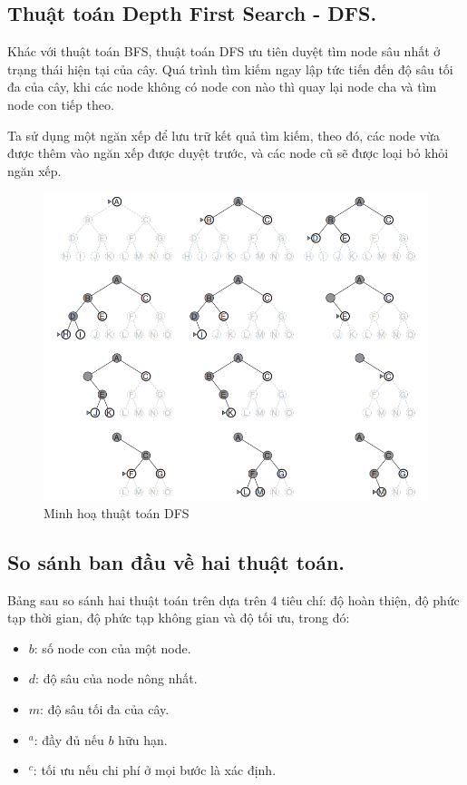 \documentclass[a4paper, 11pt]{article}
\begin{document}
\subsection{Thuật toán Depth First Search - DFS.}
Khác với thuật toán BFS, thuật toán DFS ưu tiên duyệt tìm node sâu nhất ở trạng thái hiện tại của cây. Quá trình tìm kiếm ngay lập tức tiến đến độ sâu tối đa của cây, khi các node không có node con nào thì quay lại node cha và tìm node con tiếp theo.

Ta sử dụng một ngăn xếp để lưu trữ kết quả tìm kiếm, theo đó, các node vừa được thêm vào ngăn xếp được duyệt trước, và các node cũ sẽ được loại bỏ khỏi ngăn xếp.

\begin{figure}[h]
    \centering
    \includegraphics[width=\textwidth,height=\textheight,keepaspectratio]{dfs_demo.png}
    \caption{Minh hoạ thuật toán DFS}
\end{figure}

\subsection{So sánh ban đầu về hai thuật toán.}
Bảng sau so sánh hai thuật toán trên dựa trên 4 tiêu chí: độ hoàn thiện, độ phức tạp thời gian, độ phức tạp không gian và độ tối ưu, trong đó:

\begin{itemize}
    \item $b$: số node con của một node.
    \item $d$: độ sâu của node nông nhất.
    \item $m$: độ sâu tối đa của cây.
    \item ${}^a$: đầy đủ nếu $b$ hữu hạn.
    \item ${}^c$: tối ưu nếu chi phí ở mọi bước là xác định.
\end{itemize}
\end{document}
